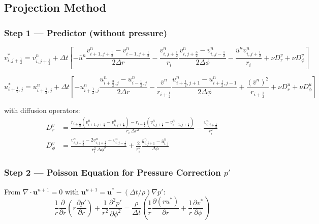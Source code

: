 \subsection{Projection Method}

\subsubsection{Step 1 --- Predictor (without pressure)}

\begin{equation}
\boxed{
v^{*}_{i,j+\frac{1}{2}} = v^n_{i,j+\frac{1}{2}}
+\Delta t\left[
  -\bar{u}^n\frac{v^n_{i+1,j+\frac{1}{2}}-v^n_{i-1,j+\frac{1}{2}}}{2\Delta r}
  -\frac{v^n_{i,j+\frac{1}{2}}}{r_i}\frac{v^n_{i,j+\frac{3}{2}}-v^n_{i,j-\frac{1}{2}}}{2\Delta\phi}
  -\frac{\bar{u}^n v^n_{i,j+\frac{1}{2}}}{r_i}
  +\nu D_r^v + \nu D_\phi^v
\right]
}
\label{eq:cyl_uv_pred_v}
\end{equation}

\begin{equation}
\boxed{
u^{*}_{i+\frac{1}{2},j} = u^n_{i+\frac{1}{2},j}
+\Delta t\left[
  -u^n_{i+\frac{1}{2},j}\frac{u^n_{i+\frac{3}{2},j}-u^n_{i-\frac{1}{2},j}}{2\Delta r}
  -\frac{\bar{v}^n}{r_{i+\frac{1}{2}}}\frac{u^n_{i+\frac{1}{2},j+1}-u^n_{i+\frac{1}{2},j-1}}{2\Delta\phi}
  +\frac{(\bar{v}^n)^2}{r_{i+\frac{1}{2}}}
  +\nu D_r^u + \nu D_\phi^u
\right]
}
\label{eq:cyl_uv_pred_u}
\end{equation}

with diffusion operators:
\begin{align}
    D_r^v &= \frac{r_{i+\frac{1}{2}}(v^n_{i+1,j+\frac{1}{2}}-v^n_{i,j+\frac{1}{2}})-r_{i-\frac{1}{2}}(v^n_{i,j+\frac{1}{2}}-v^n_{i-1,j+\frac{1}{2}})}{r_i\,\Delta r^2}
            -\frac{v^n_{i,j+\frac{1}{2}}}{r_i^2}
    \\[4pt]
    D_\phi^v &= \frac{v^n_{i,j+\frac{3}{2}}-2v^n_{i,j+\frac{1}{2}}+v^n_{i,j-\frac{1}{2}}}{r_i^2\,\Delta\phi^2}
               +\frac{2}{r_i^2}\frac{\bar{u}^n_{i,j+1}-\bar{u}^n_{i,j}}{\Delta\phi}
\end{align}

\subsubsection{Step 2 --- Poisson Equation for Pressure Correction $p'$}

From $\nabla\cdot\mathbf{u}^{n+1}=0$ with $\mathbf{u}^{n+1}=\mathbf{u}^*-(\Delta t/\rho)\nabla p'$:
\begin{equation}
    \frac{1}{r}\frac{\partial}{\partial r}\!\left(r\frac{\partial p'}{\partial r}\right)
    +\frac{1}{r^2}\frac{\partial^2 p'}{\partial\phi^2}
    = \frac{\rho}{\Delta t}\left(
       \frac{1}{r}\frac{\partial(ru^*)}{\partial r}
      +\frac{1}{r}\frac{\partial v^*}{\partial\phi}
      \right)
\end{equation}

